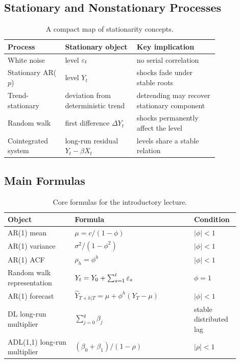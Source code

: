 \subsection{Stationary and Nonstationary Processes}
\begin{table}[h]
\centering
\small
\begin{tabular}{p{0.22\linewidth}p{0.28\linewidth}p{0.32\linewidth}}
\toprule
Process & Stationary object & Key implication \\
\midrule
White noise & level $\varepsilon_t$ & no serial correlation \\
Stationary AR($p$) & level $Y_t$ & shocks fade under stable roots \\
Trend-stationary & deviation from deterministic trend & detrending may recover stationary component \\
Random walk & first difference $\Delta Y_t$ & shocks permanently affect the level \\
Cointegrated system & long-run residual $Y_t-\beta X_t$ & levels share a stable relation \\
\bottomrule
\end{tabular}
\caption{A compact map of stationarity concepts.}
\label{tab:stationarity_summary}
\end{table}

\subsection{Main Formulas}
\begin{table}[h]
\centering
\small
\begin{tabular}{p{0.27\linewidth}p{0.48\linewidth}p{0.15\linewidth}}
\toprule
Object & Formula & Condition \\
\midrule
AR(1) mean & $\mu=c/(1-\phi)$ & $|\phi|<1$ \\
AR(1) variance & $\sigma^2/(1-\phi^2)$ & $|\phi|<1$ \\
AR(1) ACF & $\rho_h=\phi^h$ & $|\phi|<1$ \\
Random walk representation & $Y_t=Y_0+\sum_{s=1}^{t}\varepsilon_s$ & $\phi=1$ \\
AR(1) forecast & $\widehat{Y}_{T+h|T}=\mu+\phi^h(Y_T-\mu)$ & $|\phi|<1$ \\
DL long-run multiplier & $\sum_{j=0}^{q}\beta_j$ & stable distributed lag \\
ADL(1,1) long-run multiplier & $(\beta_0+\beta_1)/(1-\rho)$ & $|\rho|<1$ \\
\bottomrule
\end{tabular}
\caption{Core formulas for the introductory lecture.}
\label{tab:main_formulas}
\end{table}

